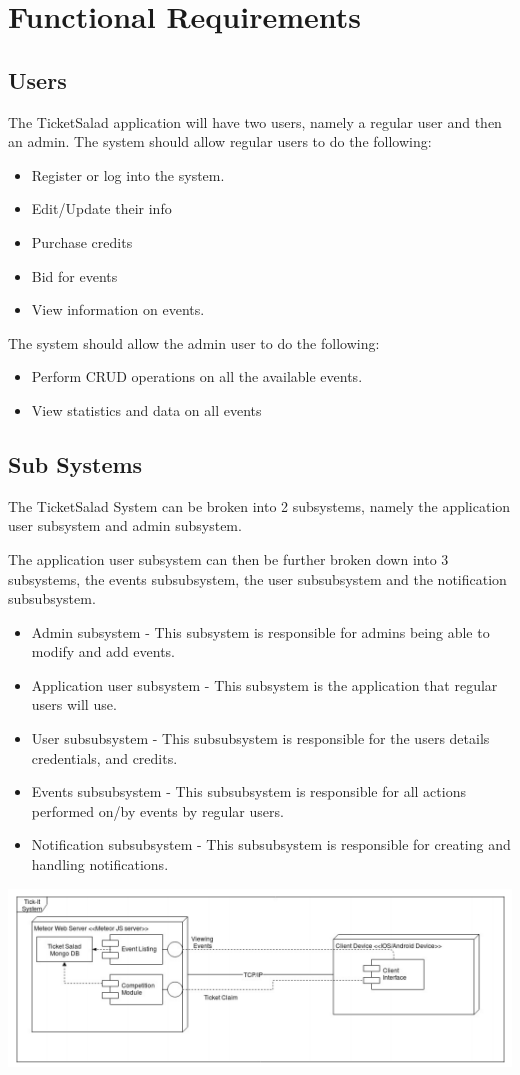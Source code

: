 \documentclass[11pt]{article}
\begin{document}
	\section{Functional Requirements}
	\subsection{Users}
	The TicketSalad application will have two users, namely a regular user and then an admin.
	The system should allow regular users to do the following:
	\begin{itemize}
		\item Register or log into the system.
		\item Edit/Update their info
		\item Purchase credits
		\item Bid for events
		\item View information on events.
	\end{itemize} 
	The system should allow the admin user to do the following:
	\begin{itemize}
		\item Perform CRUD operations on all the available events.
		\item View statistics and data on all events
	\end{itemize}
	\subsection{Sub Systems}
	The TicketSalad System can be broken into 2 subsystems, namely the application user subsystem and admin subsystem. 

	The application user subsystem can then be further broken down into 3 subsystems, the events subsubsystem, the user subsubsystem and the notification subsubsystem.
	\begin{itemize}
		\item Admin subsystem - This subsystem is responsible for admins being able to modify and add events.
		\item Application user subsystem - This subsystem is the application that regular users will use.
		\item User subsubsystem - This subsubsystem is responsible for the users details credentials, and credits.
		\item Events subsubsystem - This subsubsystem is responsible for all actions performed on/by events by regular users.
		\item Notification subsubsystem - This subsubsystem is responsible for creating and handling notifications.
	\end{itemize}
	\includegraphics[scale=1]{Architecture.png}
\end{document}
